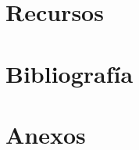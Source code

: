 \documentclass{perfil}
\begin{document}
\section{Recursos}




\newpage
\section{Bibliografía}


\newpage
\section{Anexos}


\end{document}
